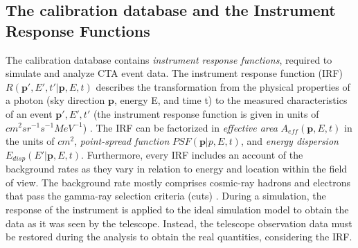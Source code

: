 \subsection{The calibration database and the Instrument Response Functions}
\label{ss:caldb}
The calibration database contains \textit{instrument response functions}, required to simulate and analyze CTA event data. The instrument response function (IRF) $R(\bm{p}',E',t'|\bm{p}, E, t)$ describes the transformation from the physical properties of a photon (sky direction $\bm{p}$, energy E, and time t) to the measured characteristics of an event $\bm{p'},E',t'$ (the instrument response function is given in units of $cm^2 sr^{-1} s^{-1} MeV^{-1}$) \cite{Knodlseder_2016}. 
The IRF can be factorized in \textit{effective area} $A_{eff}(\bm{p},E,t)$ in the units of $cm^2$, \textit{point-spread function} $PSF(\bm{p}|p,E,t)$, and \textit{energy dispersion} $E_{disp}(E'|\bm{p},E,t)$. Furthermore, every IRF includes an account of the background rates as they vary in relation to energy and location within the field of view. The background rate mostly comprises cosmic-ray hadrons and electrons that pass the gamma-ray selection criteria (cuts) \cite{di2020detection}. During a simulation, the response of the instrument is applied to the ideal simulation model  to obtain the data as it was seen by the telescope. Instead, the telescope observation data must be restored during the analysis to obtain the real quantities, considering the IRF.


